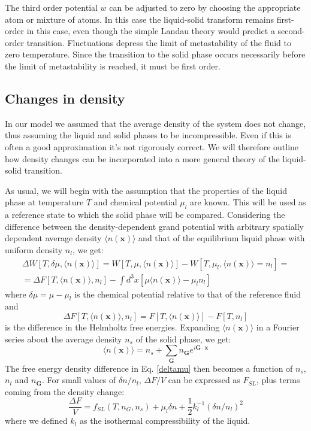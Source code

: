\documentclass[12pt,a4paper]{article}
\begin{document}
The third order potential $w$ can be adjusted to zero by choosing the appropriate atom or mixture of atoms. In this case the liquid-solid transform remains first-order in this case, even though the simple Landau theory would predict a second-order transition. Fluctuations depress the limit of metastability of the fluid to zero temperature. Since the transition to the solid phase occurs necessarily before the limit of metastability is reached, it must be first order.

\subsection{Changes in density}
In our model we assumed that the average density of the system does not change, thus assuming the liquid and solid phases to be incompressible. Even if this is often a good approximation it's not rigorously correct. We will therefore outline how density changes can be incorporated into a more general theory of the liquid-solid transition.

As usual, we will begin with the assumption that the properties of the liquid phase at temperature $T$ and chemical potential $\mu_l$ are known. This will be used as a reference state to which the solid phase will be compared. Considering the difference between the density-dependent grand potential with arbitrary spatially dependent average density $\langle n(\textbf{x}) \rangle$ and that of the equilibrium liquid phase with uniform density $n_l$, we get:
\begin{equation}
\begin{split}
\Delta W [T,\delta\mu,\langle n(\textbf{x}) \rangle]=W [T,\mu,\langle n(\textbf{x}) \rangle]-W [T,\mu_l,\langle n(\textbf{x}) \rangle = n_l]=\\
=\Delta F [T,\langle n(\textbf{x}) \rangle,n_l]-\int d^3 x [\mu \langle n(\textbf{x}) \rangle - \mu_l n_l]
\end{split}
\end{equation}
where $\delta \mu = \mu - \mu_l $ is the chemical potential relative to that of the reference fluid and
\begin{equation}
\label{deltamu}
\Delta F [ T, \langle n(\textbf{x}) \rangle , n_l] = F [ T, \langle n(\textbf{x}) \rangle] - F [T, n_l]
\end{equation}
is the difference in the Helmholtz free energies.
Expanding $\langle n(\textbf{x}) \rangle$ in a Fourier series about the average density $n_s$ of the solid phase, we get:
\begin{equation}
\langle n(\textbf{x}) \rangle = n_s + \sum_{\textbf{G}} n_{\textbf{G}} e^{i \textbf{G} \cdot \textbf{x}}
\end{equation}
The free energy density difference in Eq. \ref{deltamu} then becomes a function of $n_s$, $n_l$ and $n_{\textbf{G}}$.
For small values of $\delta n / n_l$, $\Delta F/V$ can be expressed as $F_{SL}$, plus terms coming from the density change:
\begin{equation}
\frac{\Delta F}{V}=f_{SL}(T,n_G,n_s)+\mu_l \delta n + \frac{1}{2} k^{-1}_l(\delta n / n_l)^2
\end{equation}
where we defined $k_l$ as the isothermal compressibility of the liquid. 
\end{document}
